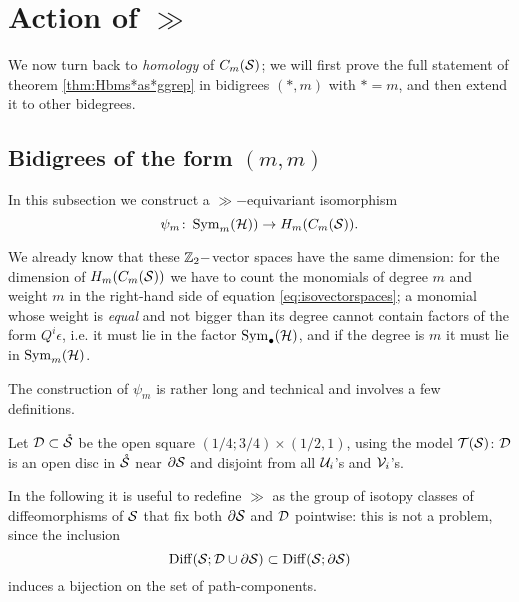 \section{Action of $\gg$}
We now turn back to \emph{homology} of $\cms$; we will first prove the full statement of theorem
\ref{thm:Hbms*as*ggrep} in bidigrees $(*,m)$ with $*=m$, and then extend it to other bidegrees.

\subsection{Bidigrees of the form $(m,m)$}
In this subsection we construct a $\gg-$equivariant isomorphism 
\[
\psi_m\colon \Sym_m(\H))\to H_m(\cms).
\]

We already know that these $\Z_2-$vector spaces have the same dimension:
for the dimension of $H_m(\cms)$ we have to count the monomials of degree $m$ and weight $m$
in the right-hand side of equation \ref{eq:isovectorspaces}; a monomial whose
weight is \emph{equal} and not bigger than its degree cannot contain factors of the form
$Q^i\epsilon$, i.e. it must lie in the factor $\Sym_{\bullet}(\H)$, and if the degree
is $m$ it must lie in $\Sym_m(\H)$.
% 


The construction of $\psi_m$ is rather long and technical and involves a few definitions.
\begin{defn}
 \label{defn:D}
 Let $\D\subset\mrS$ be the open square $(1/4;3/4)\times(1/2,1)$, using the model $\T(\S)$:
$\D$ is an open disc in $\mrS$ near $\partial\S$ and disjoint from all $\U_i$'s and $\V_i$'s.

In the following it is useful to redefine $\gg$ as the group of isotopy classes
of diffeomorphisms of $\S$ that fix both $\partial \S$ and $\D$ pointwise: this is 
not a problem, since the inclusion
\[
\Diff(\S;\D\cup\partial\S)\subset \Diff(\S;\partial\S)
\]
induces a bijection on the set of path-components.
\end{defn}

